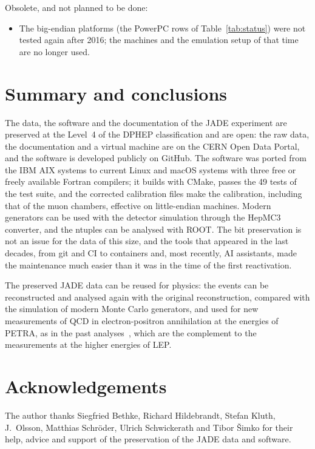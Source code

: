 Obsolete, and not planned to be done:
\begin{itemize}
\item The big-endian platforms (the PowerPC rows of Table~\ref{tab:status}) were not tested again after 2016; the machines and the emulation setup
of that time are no longer used.
\end{itemize}

\section{Summary and conclusions}
The data, the software and the documentation of the JADE experiment are preserved at the Level~4 of the DPHEP classification and are open: the raw data, the documentation and
a virtual machine are on the CERN Open Data Portal, and the software is developed publicly on GitHub. The software was ported from the IBM AIX systems
to current Linux and macOS systems with three free or freely available Fortran compilers; it builds with CMake, passes the 49 tests of the test suite, and the corrected calibration files make
the calibration, including that of the muon chambers, effective on little-endian machines. Modern generators can be used with the detector simulation through the
HepMC3 converter, and the ntuples can be analysed with ROOT.
The bit preservation is not an issue for the data of this size, and the tools that appeared in the last decades, from git and CI to containers and, most recently, AI assistants, made the
maintenance much easier than it was in the time of the first reactivation.

The preserved JADE data can be reused for physics: the events can be reconstructed and analysed again with the original reconstruction, compared with the
simulation of modern Monte Carlo generators, and used for new measurements of QCD in electron-positron annihilation at the energies of PETRA, as in
the past analyses~\cite{Verbytskyi:2019zhh,Schieck:2012mp}, which are the complement to the measurements at the higher energies of LEP.

\section*{Acknowledgements}
The author thanks Siegfried Bethke, Richard Hildebrandt, Stefan Kluth, J.~Olsson, Matthias Schr\"oder,
Ulrich Schwickerath and Tibor \v{S}imko for their help, advice and support of the preservation
of the JADE data and software.
